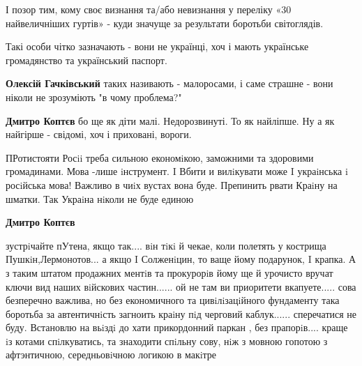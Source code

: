 \begin{itemize}
\begin{itemize}
І позор тим, кому своє визнання та/або невизнання у переліку «30 найвеличніших
гуртів» - куди значуще за результати боротьби світоглядів.

Такі особи чітко зазначають - вони не українці, хоч і мають українське
громадянство та український паспорт.

\begin{itemize}
 
\textbf{Олексій Гачківський} таких називають - малоросами, і саме страшне - вони ніколи не зрозуміють "в чому проблема?"

 
\textbf{Дмитро Коптєв} бо ще як діти малі. Недорозвинуті.
То як найліпше.
Ну а як найгірше - свідомі, хоч і приховані, вороги.

 

ПРотистояти Росii треба сильною економiкою, заможними та здоровими громадинами.
Мова -лише iнструмент. I Вбити и вилiкувати може I украiнська i росiйська мова!
Важливо в чиiх вустах вона буде. Препинить рвати Краiну на шматки. Так Украiна
нiколи не буде единою


 
\textbf{Дмитро Коптєв} 

зустрiчайте пУтена, якщо так.... вiн тiкi й чекае, коли полетять у кострища
Пушкiн,Лермонотов... а якщо I Солженiцин, то ваще йому подарунок, I крапка. А з
таким штатом продажних ментiв та прокурорiв йому ще й урочисто вручат ключи вид
наших вiйскових частин...... ой не там ви приоритети вкапуете..... сова
безперечно важлива, но без економичного та цивiлiзацiйного фундаменту така
боротьба за автентичнiсть загноить краiну пiд черговий каблук...... сперечатися
не буду. Встановлю на вьiздi до хати прикордонний паркан , без прапорiв....
краще iз котами спiлкуватись, та знаходити спiльну сову, нiж з мовною гопотою з
афтэнтичною, середньовiчною логикою в макiтре


\end{itemize}
\end{itemize}
\end{itemize}
